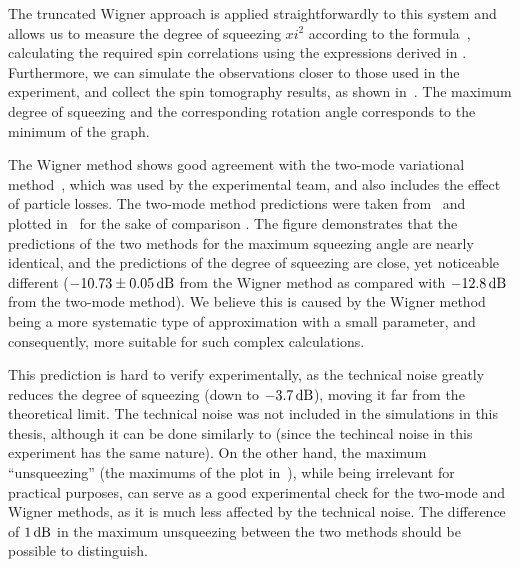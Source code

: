 The truncated Wigner approach is applied straightforwardly to this system and allows us to measure the degree of squeezing $xi^2$ according to the formula~, calculating the required spin correlations using the expressions derived in .
Furthermore, we can simulate the observations closer to those used in the experiment, and collect the spin tomography results, as shown in~.
The maximum degree of squeezing and the corresponding rotation angle corresponds to the minimum of the graph.

The Wigner method shows good agreement with the two-mode variational method~\cite{Li2009}, which was used by the experimental team, and also includes the effect of particle losses.
The two-mode method predictions were taken from~\cite{Riedel2010} and plotted in~ for the sake of comparison .
The figure demonstrates that the predictions of the two methods for the maximum squeezing angle are nearly identical, and the predictions of the degree of squeezing are close, yet noticeable different ($-10.73\pm0.05\mbox{\ensuremath{\,\mathrm{dB}}}$ from the Wigner method as compared with $-12.8\mbox{\ensuremath{\,\mathrm{dB}}}$ from the two-mode method).
We believe this is caused by the Wigner method being a more systematic type of approximation with a small parameter, and consequently, more suitable for such complex calculations.

This prediction is hard to verify experimentally, as the technical noise greatly reduces the degree of squeezing (down to $-3.7\mbox{\ensuremath{\,\mathrm{dB}}}$), moving it far from the theoretical limit.
The technical noise was not included in the simulations in this thesis, although it can be done similarly to  (since the techincal noise in this experiment has the same nature).
On the other hand, the maximum ``unsqueezing'' (the maximums of the plot in~), while being irrelevant for practical purposes, can serve as a good experimental check for the two-mode and Wigner methods, as it is much less affected by the technical noise.
The difference of $1\mbox{\ensuremath{\,\mathrm{dB}}}$ in the maximum unsqueezing between the two methods should be possible to distinguish.

